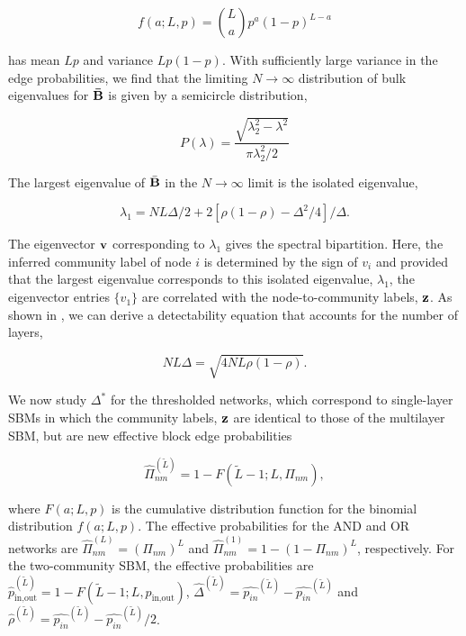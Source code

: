 \begin{equation}
f(a;L,p)={L \choose a}p^{a}(1-p)^{L-a}
\end{equation}

has mean $Lp$ and variance $Lp(1-p)$. With sufficiently large variance in the edge probabilities, we find that the limiting $N\rightarrow \infty$ distribution of bulk eigenvalues for ${\bf \bar{B}}$ is given by a semicircle distribution,

\begin{equation}
P(\lambda)=\frac{\sqrt{\lambda^2_{2}-\lambda^{2}}}{\pi \lambda_{2}^{2}/2}
\end{equation}

The largest eigenvalue of $\bar{{\bf B}}$ in the $N \rightarrow \infty$ limit is the isolated eigenvalue,

\begin{equation}
\lambda_{1}=NL\Delta/2+2[\rho(1-\rho)-\Delta^{2}/4]/\Delta. 
\end{equation}

The eigenvector ${\bf v}$ corresponding to $\lambda_{1}$ gives the spectral bipartition. Here, the inferred community label of node $i$ is determined by the sign of $v_{i}$ and provided that the largest eigenvalue corresponds to this isolated eigenvalue, $\lambda_{1}$, the eigenvector entries $\{v_{1}\}$ are correlated with the node-to-community labels, ${\bf z}$.  As shown in \cite{taylor2015enhanced}, we can derive a detectability equation that accounts for the number of layers,

\begin{equation}
NL\Delta=\sqrt{4NL\rho(1-\rho)}.
\end{equation}

\indent We now study $\Delta^{*}$ for the thresholded networks, which correspond to single-layer SBMs in which the community labels, ${\bf z}$ are identical to those of the multilayer SBM, but are new effective block edge probabilities

\begin{equation}
\hat{\Pi}_{nm}^{(\tilde{L})}=1-F(\tilde{L}-1;L,\Pi_{nm}),
\end{equation}

where $F(a;L,p)$ is the cumulative distribution function for the binomial distribution $f(a;L,p)$. The effective probabilities for the AND and OR networks are $\hat{\Pi}_{nm}^{(L)}=(\Pi_{nm})^{L}$ and $\hat{\Pi}_{nm}^{(1)}=1-(1-\Pi_{nm})^{L}$, respectively. For the two-community SBM, the effective probabilities are $\hat{p}_{\text{in,out}}^{(\tilde{L})}=1-F(\tilde{L}-1;L,p_{\text{in,out}})$, $\hat{\Delta}^{(\tilde{L})}=\hat{p_{in}}^{(\tilde{L})}-\hat{p_{in}}^{(\tilde{L})}$ and $\hat{\rho}^{(\tilde{L})}=\hat{p_{in}}^{(\tilde{L})}-\hat{p_{in}}^{(\tilde{L})}/2$. 


